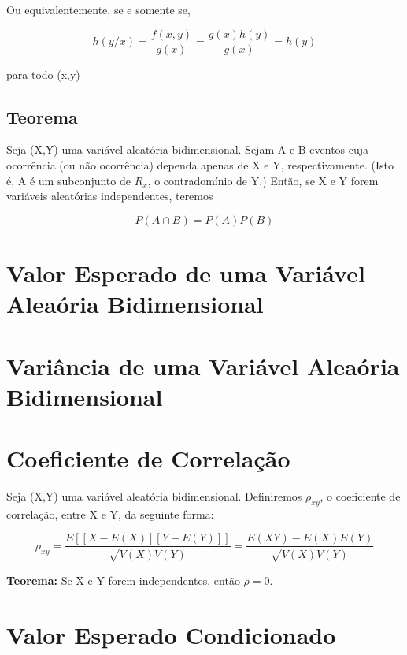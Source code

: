 \documentclass[a4paper,12pt]{report}
\begin{document}
{Ou equivalentemente, se e somente se,


\begin{equation}\label{}
    h(y/x) =\frac{f(x,y)}{g(x)} =\frac{g(x)h(y)}{g(x)}=h(y)
\end{equation}


para todo (x,y)

\subsection{Teorema}

Seja (X,Y) uma variável aleatória bidimensional. Sejam A e B
eventos cuja ocorrência (ou não ocorrência) dependa apenas de X e
Y, respectivamente. (Isto é, A é um subconjunto de $R_{x}$, o
contradomínio de Y.) Então, se X e Y forem variáveis aleatórias
independentes, teremos



\begin{equation}\label{}
    P(A\cap B)=P(A)P(B)
\end{equation}


\section{Valor Esperado de uma Variável Aleaória Bidimensional}

\section{Variância de uma Variável Aleaória Bidimensional}

\section{Coeficiente de Correlação}

Seja (X,Y) uma variável aleatória bidimensional. Definiremos
$\rho_{xy}$, o coeficiente de correlação, entre X e Y, da seguinte
forma:


\begin{equation}\label{}
    \rho_{xy} =
    \frac{E[[X-E(X)][Y-E(Y)]]}{\sqrt{V(X)V(Y)}}=\frac{E(XY)-E(X)E(Y)}{\sqrt{V(X)V(Y)}}
\end{equation}

\textbf{Teorema:} Se X e Y forem independentes, então $\rho=0$.



\section{Valor Esperado Condicionado}

}
\end{document}
